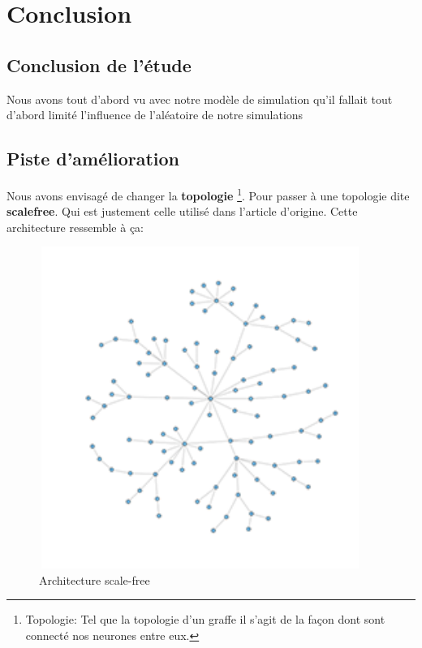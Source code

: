 \hypertarget{conclusion}{%
\chapter{Conclusion}\label{conclusion}}

\section{Conclusion de l'étude}

Nous avons tout d'abord vu avec notre modèle de simulation qu'il fallait tout d'abord limité l'influence de l'aléatoire de notre simulations

\section{Piste d'amélioration}

Nous avons envisagé de changer la \textbf{topologie} \footnote{Topologie: Tel que la topologie d'un graffe il s'agit de la façon dont sont connecté nos neurones entre eux.}. Pour passer à une topologie dite \textbf{scalefree}. Qui est justement celle utilisé dans l'article d'origine. Cette architecture ressemble à ça:

\begin{figure}[h!]
\begin{center}
\includegraphics[width=10.5cm,height=10.5cm]{./images/scalefree.png}
\end{center}
\caption{Architecture scale-free}
\label{scale_free}
\end{figure}
